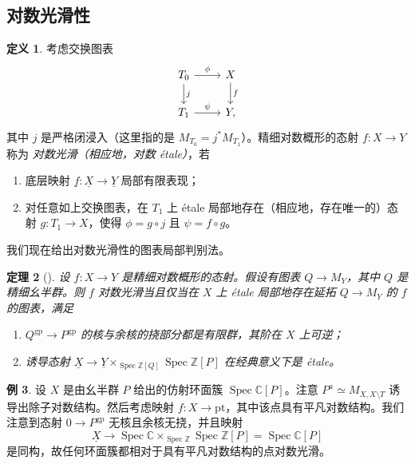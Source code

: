\documentclass{amsart}
\newtheorem{thm}{定理}[section]
\theoremstyle{definition}
\newtheorem{defn}[thm]{定义}
\newtheorem{exm}[thm]{例}
\theoremstyle{remark}
\theoremstyle{plain}
\theoremstyle{definition}
\theoremstyle{remark}
\newcommand{\C}{\mathbb{C}}
\newcommand{\Z}{\mathbb{Z}}
\newcommand{\mr}[1]{\mathrm{#1}}
\newcommand{\ul}[1]{\underline{#1}}
\newcommand{\1}{\mathbf{1}}
\newcommand{\2}{\mathbf{2}}
\newcommand{\3}{\mathbf{3}}
\DeclareMathOperator{\Spec}{Spec}
\begin{document}
\subsection{对数光滑性}%
\label{sub:Log smoothness}

\begin{defn}
    考虑交换图表
    \begin{equation*}
    \begin{tikzcd}
        T_0 \ar{r}{\phi} \ar{d}{j} & X \ar{d}{f} \\
        T_1 \ar{r}{\psi} & Y,
    \end{tikzcd}
    \end{equation*}
    其中 \(j\) 是严格闭浸入（这里指的是 \(M_{T_0} = j^* M_{T_1}\)）。精细对数概形的态射 \(f \colon X \to Y\) 称为 \textit{对数光滑（相应地，对数 \'etale）}，若
    \begin{enumerate}
        \item 底层映射 \(\ul{f} \colon \ul{X} \to \ul{Y}\) 局部有限表现；
        \item 对任意如上交换图表，在 \(T_1\) 上 \'etale 局部地存在（相应地，存在唯一的）态射 \(g \colon T_1 \to X\)，使得 \(\phi = g \circ j\) 且 \(\psi = f \circ g\)。
    \end{enumerate}
\end{defn}

我们现在给出对数光滑性的图表局部判别法。

\begin{thm}[{\cite[Theorem~3.5]{Kato1989}}]
    设 \(f \colon X \to Y\) 是精细对数概形的态射。假设有图表 \(Q \to M_Y\)，其中 \(Q\) 是精细幺半群。则 \(f\) 对数光滑当且仅当在 \(X\) 上 \'etale 局部地存在延拓 \(Q \to M_Y\) 的 \(f\) 的图表，满足
    \begin{enumerate}
        \item \(Q^{\mr{gp}} \to P^{\mr{gp}}\) 的核与余核的挠部分都是有限群，其阶在 \(X\) 上可逆；
        \item 诱导态射 \(\ul{X} \to \ul{Y} \times_{\Spec \Z[Q]} \Spec \Z[P]\) 在经典意义下是 \'etale。
    \end{enumerate}
\end{thm}

\begin{exm}
    设 \(X\) 是由幺半群 \(P\) 给出的仿射环面簇 \(\Spec \C[P]\)。注意 \(P^a \simeq M_{X, X \setminus T}\) 诱导出除子对数结构。然后考虑映射 \(f \colon X \to \mr{pt}\)，其中该点具有平凡对数结构。我们注意到态射 \(0 \to P^{\mr{gp}}\) 无核且余核无挠，并且映射
    \[ \ul{X} \to \Spec \C \times_{\Spec \Z} \Spec \Z[P] = \Spec \C[P] \]
    是同构，故任何环面簇都相对于具有平凡对数结构的点对数光滑。
\end{exm}
\end{document}
